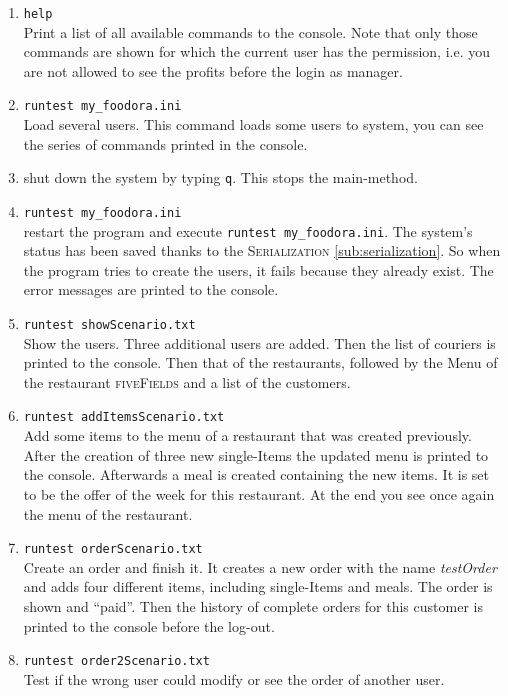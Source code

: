 \begin{enumerate}[itemsep=0mm]
	\item \lstinline|help| \\
		Print a list of all available commands to the console.
		Note that only those commands are shown for which the current user has the 
		permission, i.e. you are not allowed to see the profits before the login as 
		manager.
	\item \lstinline|runtest my_foodora.ini| \\
		Load several users. This command loads 
		some users to system, you can see the series of commands printed in the console.
	\item shut down the system by typing \lstinline|q|. This stops the main-method.
	\item \lstinline|runtest my_foodora.ini| \\
		restart the program and execute \lstinline|runtest my_foodora.ini|. The system's 
		status has been saved thanks to the \textsc{Serialization} \ref{sub:serialization}.
		So when the program tries
		to create the users, it fails because they already exist. The error messages are 
		printed to the console.
	\item \lstinline|runtest showScenario.txt| \\
		Show the users. Three additional users
		are added. Then the list of couriers is printed to the console. Then that of the 
		restaurants, followed by the Menu of the restaurant \textsc{fiveFields} and a list of
		the customers.
	\item \lstinline|runtest addItemsScenario.txt| \\
		Add some items to the menu of a restaurant that was created previously. After the creation of three new 
		single-Items the updated menu is printed to the console. Afterwards a meal is created
		containing the new items. It is set to be the offer of the week for this restaurant.
		At the end you see once again the menu of the restaurant.
	\item \lstinline|runtest orderScenario.txt| \\
		Create an order and finish it. It 
		creates a new order with the name \textit{testOrder} and adds four different items, 
		including single-Items and meals. The order is shown and ``paid''. Then the history
		of complete orders for this customer is printed to the console before the log-out.
	\item \lstinline|runtest order2Scenario.txt| \\
		Test if the wrong user could modify or see the order of another user.

\end{enumerate}
